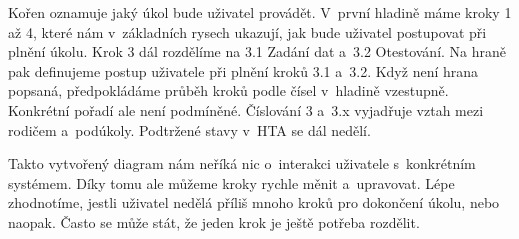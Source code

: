 Kořen oznamuje jaký úkol bude uživatel provádět. V~první hladině máme kroky 1 až 4, které nám v~základních rysech ukazují, jak bude uživatel postupovat při plnění úkolu. Krok 3 dál rozdělíme na 3.1 Zadání dat a~3.2 Otestování. Na hraně pak definujeme postup uživatele při plnění kroků 3.1 a~3.2. Když není hrana popsaná, předpokládáme průběh kroků podle čísel v~hladině vzestupně. Konkrétní pořadí ale není podmíněné. Číslování 3 a~3.x vyjadřuje vztah mezi rodičem a~podúkoly.  Podtržené stavy v~HTA se dál nedělí. 

Takto vytvořený diagram nám neříká nic o~interakci uživatele s~konkrétním systémem. Díky tomu ale můžeme kroky rychle měnit a~upravovat. Lépe zhodnotíme, jestli uživatel nedělá příliš mnoho kroků pro dokončení úkolu, nebo naopak. Často se může stát, že jeden krok je ještě potřeba rozdělit.

